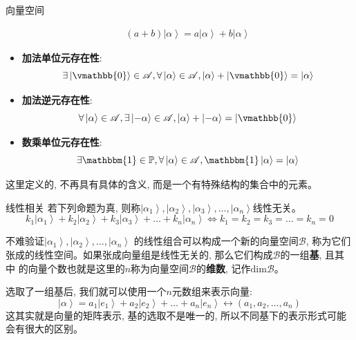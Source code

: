 \begin{define}{向量空间}
\begin{itemize}
\[\begin{array}{l}
        \left( {a + b} \right)\left| \alpha  \right\rangle  = a\left| \alpha  \right\rangle  + b\left| \alpha  \right\rangle 
        \end{array}\]
    \item \textbf{加法单位元存在性}:\[\exists \left| \vmathbb{0} \right\rangle  \in \mathscr{A},\forall \left| \alpha  \right\rangle  \in \mathscr{A},\left| \alpha  \right\rangle  + \left| \vmathbb{0} \right\rangle  = \left| \alpha  \right\rangle \]
    \item \textbf{加法逆元存在性}:\[\forall \left| \alpha  \right\rangle  \in \mathscr{A},\exists \left| { - \alpha } \right\rangle  \in \mathscr{A},\left| \alpha  \right\rangle  + \left| { - \alpha } \right\rangle  = \left| \vmathbb{0} \right\rangle \]
    \item \textbf{数乘单位元存在性}:\[\exists \mathbbm{1}\in \mathbb{P},\forall \left| \alpha  \right\rangle  \in \mathscr{A},\mathbbm{1}\left| \alpha  \right\rangle  = \left| \alpha  \right\rangle \]
\end{itemize}
\end{define}
这里定义的, 不再具有具体的含义, 而是一个有特殊结构的集合中的元素。
\begin{define}{线性相关}
    若下列命题为真, 则称${\left| {{\alpha _1}} \right\rangle  ,\left| {{\alpha _2}} \right\rangle  ,\left| {{\alpha _3}} \right\rangle , \ldots,\left| {{\alpha _n}} \right\rangle }$线性无关。
    \[{k_1}\left| {{\alpha _1}} \right\rangle  + {k_2}\left| {{\alpha _2}} \right\rangle  + {k_3}\left| {{\alpha _3}} \right\rangle +\ldots + {k_n}\left| {{\alpha _n}} \right\rangle  \Leftrightarrow {k_1} = {k_2} = {k_3} =\ldots  = {k_n} = 0\]
\end{define}
不难验证${\left| {{\alpha _1}} \right\rangle  ,\left| {{\alpha _2}} \right\rangle  , \ldots,\left| {{\alpha _n}} \right\rangle }$
的线性组合可以构成一个新的向量空间$\mathscr{B}$, 称为它们张成的线性空间。如果张成向量组是线性无关的, 那么它们构成$\mathscr{B}$的一组\textbf{基}, 且其中
的向量个数也就是这里的$n$称为向量空间$\mathscr{B}$的\textbf{维数}, 记作$\mathrm{dim} \mathscr{B}$。

选取了一组基后, 我们就可以使用一个$n$元数组来表示向量:\[\left| \alpha  \right\rangle  = {a_1}\left| {{e_1}} \right\rangle  + {a_2}\left| {{e_2}} \right\rangle  + \ldots + {a_n}\left| {{e_n}} \right\rangle  \leftrightarrow \left( {{a_1},{a_2},\ldots,{a_n}} \right)\]
这其实就是向量的矩阵表示, 基的选取不是唯一的, 所以不同基下的表示形式可能会有很大的区别。
